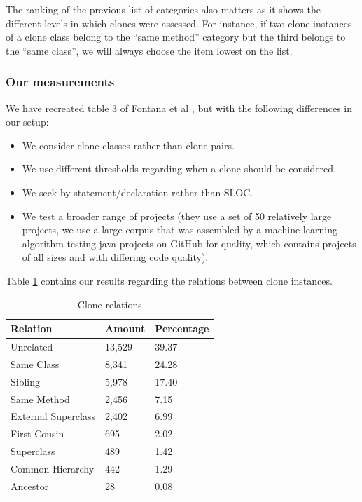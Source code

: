 \documentclass[a4paper]{article}
\begin{document}
The ranking of the previous list of categories also matters as it shows the different levels in which clones were assessed. For instance, if two clone instances of a clone class belong to the ``same method'' category but the third belongs to the ``same class'', we will always choose the item lowest on the list.

\subsubsection{Our measurements}
We have recreated table 3 of Fontana et al \cite{fontana2015duplicated}, but with the following differences in our setup:
\begin{itemize}
  \item We consider clone classes rather than clone pairs.
\item We use different thresholds regarding when a clone should be considered.
\item We seek by statement/declaration rather than SLOC.
\item We test a broader range of projects (they use a set of 50 relatively large projects, we use a large corpus that was assembled by a machine learning algorithm testing java projects on GitHub for quality, which contains projects of all sizes and with differing code quality).
\end{itemize}

Table \ref{table:relations} contains our results regarding the relations between clone instances.

\begin{table}[H]
  \begin{center}
  \caption{Clone relations} \label{table:relations}
  \bigskip
\begin{tabular}{|l|l|l|} \hline
\textbf{Relation}  & \textbf{Amount} & \textbf{Percentage} \\ \hline
Unrelated          & 13,529           & 39.37               \\ \hline
Same Class          & 8,341            & 24.28               \\ \hline
Sibling            & 5,978            & 17.40               \\ \hline
Same Method         & 2,456            & 7.15                \\ \hline
External Superclass & 2,402            & 6.99                \\ \hline
First Cousin        & 695             & 2.02                \\ \hline
Superclass         & 489             & 1.42                \\ \hline
Common Hierarchy    & 442             & 1.29                \\ \hline
Ancestor           & 28              & 0.08               \\ \hline
\end{tabular}
\end{center}
\end{table}
\end{document}
